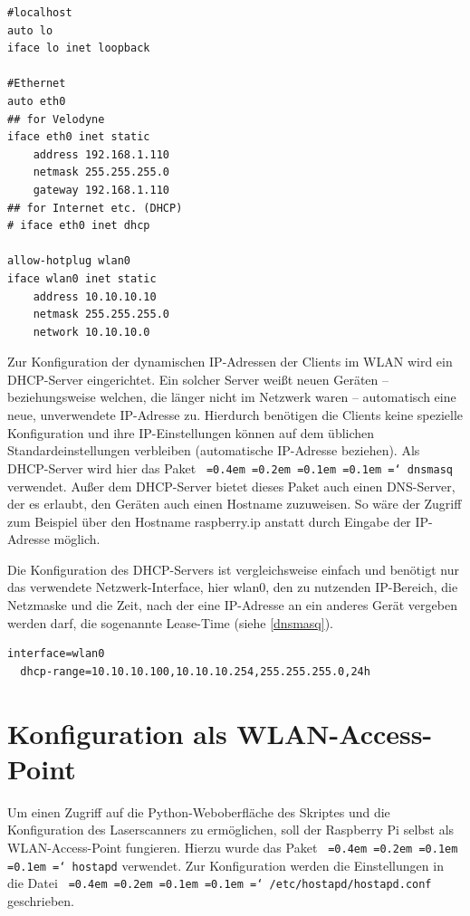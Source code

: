 \documentclass[a4paper,12pt,bibliography=totoc, listof=totoc,titlepage,pointlessnumbers]{scrreprt}
\newcommand*\justify{%
  \fontdimen2\font=0.4em%
  \fontdimen3\font=0.2em%
  \fontdimen4\font=0.1em%
  \fontdimen7\font=0.1em%
  \hyphenchar\font=`\-%
}
\newcommand{\code}[1]{\texttt{\justify{#1}}}
\begin{document}
\begin{lstlisting}[caption={Konfiguration der \code{/etc/network/interfaces}}, label={interfaces}]
#localhost
auto lo
iface lo inet loopback

#Ethernet
auto eth0
## for Velodyne
iface eth0 inet static
	address 192.168.1.110
	netmask 255.255.255.0
	gateway 192.168.1.110
## for Internet etc. (DHCP)
# iface eth0 inet dhcp

allow-hotplug wlan0
iface wlan0 inet static
	address 10.10.10.10
	netmask 255.255.255.0
	network 10.10.10.0
\end{lstlisting}

Zur Konfiguration der dynamischen IP-Adressen der Clients im WLAN wird ein DHCP-Server eingerichtet. Ein solcher Server weißt neuen Geräten -- beziehungsweise welchen, die länger nicht im Netzwerk waren -- automatisch eine neue, unverwendete IP-Adresse zu. Hierdurch benötigen die Clients keine spezielle Konfiguration und ihre IP-Einstellungen können auf dem üblichen Standardeinstellungen verbleiben (automatische IP-Adresse beziehen). Als DHCP-Server wird hier das Paket \code{dnsmasq} verwendet. Außer dem DHCP-Server bietet dieses Paket auch einen DNS-Server, der es erlaubt, den Geräten auch einen Hostname zuzuweisen. So wäre der Zugriff zum Beispiel über den Hostname raspberry.ip anstatt durch Eingabe der IP-Adresse möglich.

Die Konfiguration des DHCP-Servers ist vergleichsweise einfach und benötigt nur das verwendete Netzwerk-Interface, hier wlan0, den zu nutzenden IP-Bereich, die Netzmaske und die Zeit, nach der eine IP-Adresse an ein anderes Gerät vergeben werden darf, die sogenannte Lease-Time (siehe \autoref{dnsmasq}). \citep{accesspoint}

  
\begin{lstlisting}[caption={Konfiguration der \code{/etc/dnsmasq.conf}}, label={dnsmasq}]
interface=wlan0
  dhcp-range=10.10.10.100,10.10.10.254,255.255.255.0,24h
\end{lstlisting}

\section{Konfiguration als WLAN-Access-Point}
Um einen Zugriff auf die Python-Weboberfläche des Skriptes und die Konfiguration des Laser\-scan\-ners zu ermöglichen, soll der Raspberry Pi selbst als WLAN-Access-Point fungieren. Hierzu wurde das Paket \code{hostapd} verwendet. Zur Konfiguration werden die Einstellungen in die Datei \code{/etc/hostapd/hostapd.conf} geschrieben. \citep{accesspoint}
\end{document}

